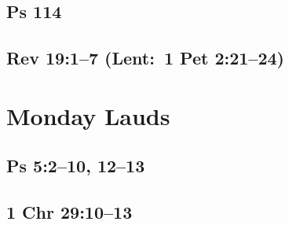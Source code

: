 \subsection{Ps 114}

{%
\parindent 0pt
\noindent
\ifx\preLilyPondExample \undefined
\else
  \expandafter\preLilyPondExample
\fi
\def\lilypondbook{}%

\ifx\postLilyPondExample \undefined
\else
  \expandafter\postLilyPondExample
\fi
}

\subsection{Rev 19:1--7 (Lent: 1 Pet 2:21--24)}

{%
\parindent 0pt
\noindent
\ifx\preLilyPondExample \undefined
\else
  \expandafter\preLilyPondExample
\fi
\def\lilypondbook{}%

\ifx\postLilyPondExample \undefined
\else
  \expandafter\postLilyPondExample
\fi
}




\section{Monday Lauds}

\subsection{Ps 5:2--10, 12--13}

{%
\parindent 0pt
\noindent
\ifx\preLilyPondExample \undefined
\else
  \expandafter\preLilyPondExample
\fi
\def\lilypondbook{}%

\ifx\postLilyPondExample \undefined
\else
  \expandafter\postLilyPondExample
\fi
}

\subsection{1 Chr 29:10--13}

{%
\parindent 0pt
\noindent
\ifx\preLilyPondExample \undefined
\else
  \expandafter\preLilyPondExample
\fi
\def\lilypondbook{}%

\ifx\postLilyPondExample \undefined
\else
  \expandafter\postLilyPondExample
\fi
}

